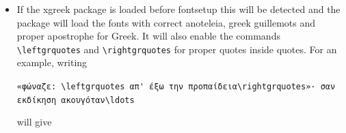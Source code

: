 \documentclass{book}
\newcommand\leftgrquotes{\char"201C}
\newcommand\rightgrquotes{\char"201E}
\begin{document}
\begin{description}
\begin{itemize}
        \verb|\textipa{...}| to select the fonts
        for IPA symbols locally. Compare 
        (produced with \verb|\textipa{ðŋβθχ}|) with ðŋβθχ.
        \verb|\textoldipa| is also available (check the documentation of
        the NewComputerModern family).
      \item If the xgreek package is loaded before fontsetup this will be detected and the package
        will load the fonts with correct anoteleia, greek guillemots and proper apostrophe for
        Greek. It will also enable the commands \verb|\leftgrquotes| and \verb|\rightgrquotes| for proper
        quotes inside quotes. For an example, writing

        \verb|«φώναζε: \leftgrquotes απ' έξω την προπαίδεια\rightgrquotes»· σαν εκδίκηση ακουγόταν\ldots|

        will give
        

\end{itemize}
\end{description}
\end{document}
